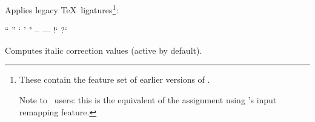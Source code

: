           Applies legacy \TeX\ ligatures\footnote{%
            These contain the feature set  of earlier
            versions of .

            Note to \XeTeX\ users: this is the equivalent of the
            assignment  using \XeTeX's input
            remapping feature.
          }:

          \unless \iffalse
            \begintabulate [rlrl]
              \beginrow ``  \newcell  {\inlinecode !``! } \newcell  ''  \newcell  {\inlinecode !''!} \endrow
              \beginrow `   \newcell  {\inlinecode !`!  } \newcell  '   \newcell  {\inlinecode !'! } \endrow
              \beginrow "   \newcell  {\inlinecode !"!  } \newcell  --  \newcell  {\inlinecode !--!} \endrow
              \beginrow --- \newcell  {\inlinecode !---!} \newcell  !`  \newcell  {\inlinecode ?!`?} \endrow
              \beginrow ?`  \newcell  {\inlinecode !?`! } \newcell      \newcell                     \endrow
            \endtabulate
          \else
            \startframed [frame=off,width=broad,align=middle]
              \startframed [frame=off,width=\dimexpr(\textwidth/2)]
                \startxtable [align=middle]
                    \startxrow \startxcell ``  \stopxcell \startxcell  {}  \stopxcell \startxcell  ''  \stopxcell \startxcell  {}  \stopxcell \stopxrow
                    \startxrow \startxcell `   \stopxcell \startxcell  {}   \stopxcell \startxcell  '   \stopxcell \startxcell  {}   \stopxcell \stopxrow
                    \startxrow \startxcell "   \stopxcell \startxcell  {}   \stopxcell \startxcell  --  \stopxcell \startxcell  \inlinecode {--}  \stopxcell \stopxrow
                    \startxrow \startxcell --- \stopxcell \startxcell  \inlinecode {---} \stopxcell \startxcell  !`  \stopxcell \startxcell  {}  \stopxcell \stopxrow
                    \startxrow \startxcell ?`  \stopxcell \startxcell  {}  \stopxcell \startxcell      \stopxcell \startxcell                    \stopxcell \stopxrow
                \stopxtable
              \stopframed
            \stopframed
          \fi
  \endaltitem

          Computes italic correction values (active by default).
  \endaltitem

